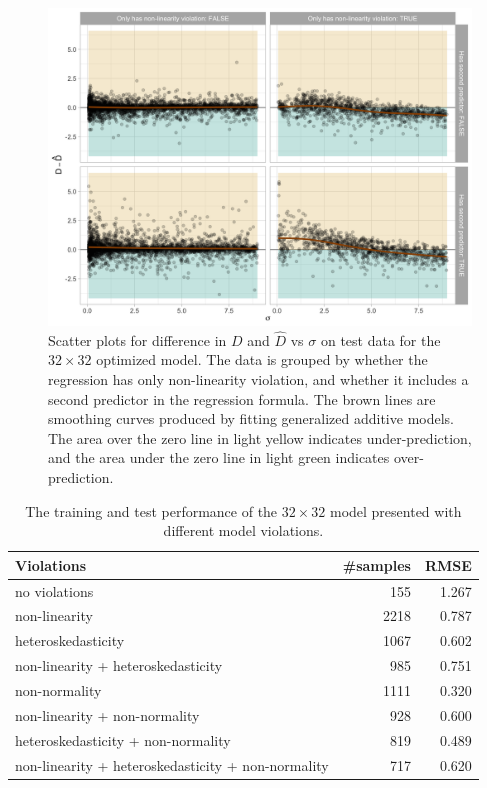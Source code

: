 \documentclass[]{interact}
\theoremstyle{plain}%
\theoremstyle{definition}
\theoremstyle{remark}
\begin{document}
\begin{figure}[!h]

{\centering \includegraphics[width=1\linewidth]{paper_files/figure-latex/over-under-1} 

}

\caption{Scatter plots for difference in $D$ and $\hat{D}$ vs $\sigma$ on test data for the $32 \times 32$ optimized model. The data is grouped by whether the regression has only non-linearity violation, and whether it includes a second predictor in the regression formula. The brown lines are smoothing curves produced by fitting generalized additive models. The area over the zero line in light yellow indicates under-prediction, and the area under the zero line in light green indicates over-prediction.}\label{fig:over-under}
\end{figure}

\begin{table}

\caption{\label{tab:performance-sub}The training and test performance of the $32 \times 32$ model presented with different model violations.}
\centering
\begin{tabular}[t]{lrr}
\toprule
Violations & \#samples & RMSE\\
\midrule
no violations & 155 & 1.267\\
non-linearity & 2218 & 0.787\\
heteroskedasticity & 1067 & 0.602\\
non-linearity + heteroskedasticity & 985 & 0.751\\
non-normality & 1111 & 0.320\\
non-linearity + non-normality & 928 & 0.600\\
heteroskedasticity + non-normality & 819 & 0.489\\
non-linearity + heteroskedasticity + non-normality & 717 & 0.620\\
\bottomrule
\end{tabular}
\end{table}
\end{document}
